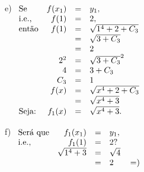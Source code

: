 \documentclass[oneside,12pt]{article}
\begin{document}
{{\bsk

e) $\begin{array}[t]{lrcl}
    \text{Se}    & f(x_1) &=& y_1, \\
    \text{i.e.,} & f(1)   &=& 2,   \\
    \text{então} & f(1)   &=& \sqrt{1^4+2+C_3} \\
                         &&=& \sqrt{3+C_3} \\
                         &&=& 2 \\
                 & 2^2    &=& \sqrt{3+C_3}^2 \\
                 & 4      &=&       3+C_3    \\
                 & C_3    &=& 1 \\
                 & f(x)   &=& \sqrt{x^4+2+C_3} \\
                 &        &=& \sqrt{x^4+3} \\
    \text{Seja:} & f_1(x) &=& \sqrt{x^4+3}. \\
    \end{array}
   $

\bsk

f) $\begin{array}[t]{lrcl}
    \text{Será que} & f_1(x_1) &=& y_1, \\
    \text{i.e.,}    & f_1(1)   &=& 2?   \\
                & \sqrt{1^4+3} &=& \sqrt{4} \\
                              &&=& 2 \qquad \smile \\
    \end{array}
   $


}}


\newpage

\end{document}
